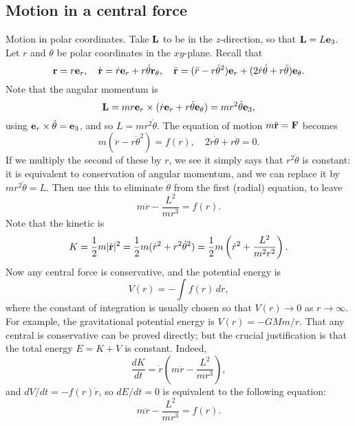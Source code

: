 \documentclass[10pt, a4paper]{article}
\begin{document}
\subsection{Motion in a central force}
Motion in polar coordinates.
Take $\mathbf{L}$ to be in the $z$-direction,
so that $\mathbf{L} = L\mathbf{e}_3$.
Let $r$ and $\theta$ be polar coordinates in the $xy$-plane.
Recall that
\[
\mathbf{r} = r\mathbf{e}_r,\quad\dot{\mathbf{r}} = \dot{r}\mathbf{e}_r + r\dot{\theta}\mathbf{r}_{\theta},\quad\ddot{\mathbf{r}} = (\ddot{r} - r\dot{\theta} ^ 2)\mathbf{e}_r + (2\dot{r}\dot{\theta} + r\ddot{\theta})\mathbf{e}_{\theta}.
\]
Note that the angular momentum is
\[
\mathbf{L} = mr\mathbf{e}_r \times (\dot{r}\mathbf{e}_r + r\dot{\theta}\mathbf{e}_{\theta}) = mr ^ 2\dot{\theta}\mathbf{e}_3,
\]
using $\mathbf{e}_r \times \dot{\theta} = \mathbf{e}_3$,
and so  $L = mr ^ 2\dot{\theta}$.
The equation of motion $m\ddot{\mathbf{r}} = \mathbf{F}$ becomes
\[
m(\ddot{r} - r\dot{\theta} ^ 2) = f(r),\quad 2\dot{r}\dot{\theta} + r\ddot{\theta} = 0.
\]
If we multiply the second of these by $r$,
we see it simply says that $r ^ 2\dot{\theta}$ is constant:
it is equivalent to conservation of angular momentum,
and we can replace it by $mr ^ 2\dot{\theta} = L$.
Then use this to eliminate $\dot{\theta}$ from the first
(radial)
equation,
to leave
\[
m\ddot{r} - \frac{L ^ 2}{mr ^ 3} = f(r).
\]
Note that the kinetic is
\[
K = \frac{1}{2}m|\dot{\mathbf{r}}| ^ 2 = \frac{1}{2}m(\dot{r} ^ 2 + r ^ 2\dot{\theta} ^ 2) = \frac{1}{2}m\left(\dot{r} ^ 2 + \frac{L ^ 2}{m ^ 2r ^ 2}\right).
\]
Now any central force is conservative,
and the potential energy is
\[
V(r) = -\int f(r)\,dr,
\]
where the constant of integration is usually chosen so that $V(r) \rightarrow 0$ as $r \rightarrow \infty$.
For example,
the gravitational potential energy is $V(r) = -GMm / r$.
That any central is conservative can be proved directly;
but the crucial justification is that the total energy $E = K + V$ is constant.
Indeed,
\[
\frac{dK}{dt} = \dot{r}\left(m\ddot{r} - \frac{L ^ 2}{mr ^ 3}\right),
\]
and $dV / dt = -f(r)\dot{r}$,
so $dE / dt = 0$ is equivalent to the following equation:
\[
m\ddot{r} - \frac{L ^ 2}{mr ^ 3} = f(r).
\]
\end{document}
